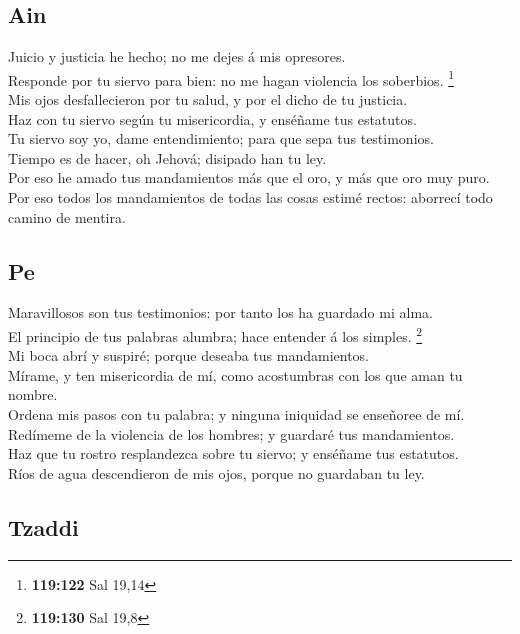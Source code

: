 \hypertarget{ain}{%
\subsection{Ain}\label{ain}}

 Juicio y justicia he hecho; no me dejes á mis
opresores.\\
 Responde por tu siervo para bien: no me hagan violencia
los soberbios. \footnote{\textbf{119:122} Sal 19,14}\\
 Mis ojos desfallecieron por tu salud, y por el dicho de
tu justicia.\\
 Haz con tu siervo según tu misericordia, y enséñame tus
estatutos.\\
 Tu siervo soy yo, dame entendimiento; para que sepa tus
testimonios.\\
 Tiempo es de hacer, oh Jehová; disipado han tu ley.\\
 Por eso he amado tus mandamientos más que el oro, y más
que oro muy puro.\\
 Por eso todos los mandamientos de todas las cosas estimé
rectos: aborrecí todo camino de mentira.

\hypertarget{pe}{%
\subsection{Pe}\label{pe}}

 Maravillosos son tus testimonios: por tanto los ha
guardado mi alma.\\
 El principio de tus palabras alumbra; hace entender á los
simples. \footnote{\textbf{119:130} Sal 19,8}\\
 Mi boca abrí y suspiré; porque deseaba tus
mandamientos.\\
 Mírame, y ten misericordia de mí, como acostumbras con
los que aman tu nombre.\\
 Ordena mis pasos con tu palabra; y ninguna iniquidad se
enseñoree de mí.\\
 Redímeme de la violencia de los hombres; y guardaré tus
mandamientos.\\
 Haz que tu rostro resplandezca sobre tu siervo; y
enséñame tus estatutos.\\
 Ríos de agua descendieron de mis ojos, porque no
guardaban tu ley.

\hypertarget{tzaddi}{%
\subsection{Tzaddi}\label{tzaddi}}


